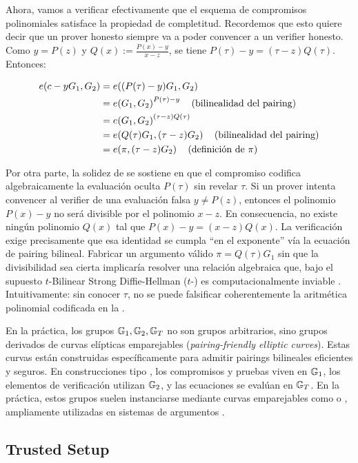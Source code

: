 Ahora, vamos a verificar efectivamente que el esquema de compromisos polinomiales \KZG satisface la propiedad de completitud. Recordemos que esto quiere decir que un prover honesto siempre va a poder convencer a un verifier honesto. Como $y = P(z)$ y $Q(x) := \frac{P(x)-y}{x-z}$, se tiene $P(\tau) - y = (\tau - z)Q(\tau)$. Entonces:

	$$\begin{aligned}
		e\!\left(c - yG_1,G_2\right) &= e\!\left((P(\tau) - y)G_1,G_2\right) \\
	&= e\!\left(G_1,G_2\right)^{P(\tau) - y} \quad (\text{bilinealidad del pairing}) \\
	&= e\!\left(G_1,G_2\right)^{(\tau - z)Q(\tau)} \\
	&= e\!\left(Q(\tau)G_1,(\tau - z)G_2\right) \quad (\text{bilinealidad del pairing}) \\
	&= e\!\left(\pi,(\tau - z)G_2\right) \quad (\text{definición de } \pi)
\end{aligned}$$

Por otra parte, la solidez de \KZG se sostiene en que el compromiso codifica algebraicamente la evaluación oculta $P(\tau)$ sin revelar $\tau$. Si un prover intenta convencer al verifier de una evaluación falsa $y \neq P(z)$, entonces el polinomio $P(x) - y$ no será divisible por el polinomio $x - z$. En consecuencia, no existe ningún polinomio 
$Q(x)$ tal que $P(x) - y = (x - z)Q(x)$. La verificación exige precisamente que esa identidad se cumpla “en el exponente” vía la ecuación de pairing bilineal. Fabricar un argumento válido $\pi = Q(\tau) G_1$ sin que la divisibilidad sea cierta implicaría resolver una relación algebraica que, bajo el supuesto $t$-Bilinear Strong Diffie-Hellman ($t$-\BSDH) es computacionalmente inviable \cite{Kate2010}. Intuitivamente: sin conocer 
$\tau$, no se puede falsificar coherentemente la aritmética polinomial codificada en la \SRS.

En la práctica, los grupos $\mathbb{G}_1, \mathbb{G}_2, \mathbb{G}_T$ no son grupos arbitrarios, sino grupos derivados de curvas elípticas emparejables (\textit{pairing-friendly elliptic curves}). Estas curvas están construidas específicamente para admitir pairings bilineales eficientes y seguros. En construcciones tipo \KZG, los compromisos y pruebas viven en $\mathbb{G}_1$, los elementos de verificación utilizan $\mathbb{G}_2$, y las ecuaciones se evalúan en $\mathbb{G}_T$. En la práctica, estos grupos suelen instanciarse mediante curvas emparejables como \BLS o \BN, ampliamente utilizadas en sistemas de argumentos \zkSNARK.

\subsection{Trusted Setup}
\label{subsec:apendice-b-kzg-trusted-setup}

